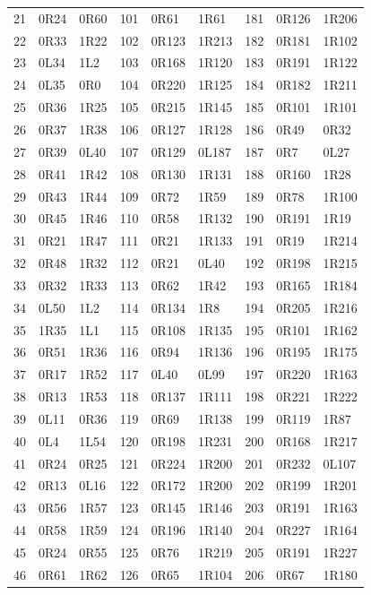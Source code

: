 \begin{longtable}{rll@{\hspace{1.3em}}rll@{\hspace{1.3em}}rll}
21 & 0R24 & 0R60 & 101 & 0R61 & 1R61 & 181 & 0R126 & 1R206\\
22 & 0R33 & 1R22 & 102 & 0R123 & 1R213 & 182 & 0R181 & 1R102\\
23 & 0L34 & 1L2 & 103 & 0R168 & 1R120 & 183 & 0R191 & 1R122\\
24 & 0L35 & 0R0 & 104 & 0R220 & 1R125 & 184 & 0R182 & 1R211\\
25 & 0R36 & 1R25 & 105 & 0R215 & 1R145 & 185 & 0R101 & 1R101\\
26 & 0R37 & 1R38 & 106 & 0R127 & 1R128 & 186 & 0R49 & 0R32\\
27 & 0R39 & 0L40 & 107 & 0R129 & 0L187 & 187 & 0R7 & 0L27\\
28 & 0R41 & 1R42 & 108 & 0R130 & 1R131 & 188 & 0R160 & 1R28\\
29 & 0R43 & 1R44 & 109 & 0R72 & 1R59 & 189 & 0R78 & 1R100\\
30 & 0R45 & 1R46 & 110 & 0R58 & 1R132 & 190 & 0R191 & 1R19\\
31 & 0R21 & 1R47 & 111 & 0R21 & 1R133 & 191 & 0R19 & 1R214\\
32 & 0R48 & 1R32 & 112 & 0R21 & 0L40 & 192 & 0R198 & 1R215\\
33 & 0R32 & 1R33 & 113 & 0R62 & 1R42 & 193 & 0R165 & 1R184\\
34 & 0L50 & 1L2 & 114 & 0R134 & 1R8 & 194 & 0R205 & 1R216\\
35 & 1R35 & 1L1 & 115 & 0R108 & 1R135 & 195 & 0R101 & 1R162\\
36 & 0R51 & 1R36 & 116 & 0R94 & 1R136 & 196 & 0R195 & 1R175\\
37 & 0R17 & 1R52 & 117 & 0L40 & 0L99 & 197 & 0R220 & 1R163\\
38 & 0R13 & 1R53 & 118 & 0R137 & 1R111 & 198 & 0R221 & 1R222\\
39 & 0L11 & 0R36 & 119 & 0R69 & 1R138 & 199 & 0R119 & 1R87\\
40 & 0L4 & 1L54 & 120 & 0R198 & 1R231 & 200 & 0R168 & 1R217\\
41 & 0R24 & 0R25 & 121 & 0R224 & 1R200 & 201 & 0R232 & 0L107\\
42 & 0R13 & 0L16 & 122 & 0R172 & 1R200 & 202 & 0R199 & 1R201\\
43 & 0R56 & 1R57 & 123 & 0R145 & 1R146 & 203 & 0R191 & 1R163\\
44 & 0R58 & 1R59 & 124 & 0R196 & 1R140 & 204 & 0R227 & 1R164\\
45 & 0R24 & 0R55 & 125 & 0R76 & 1R219 & 205 & 0R191 & 1R227\\
46 & 0R61 & 1R62 & 126 & 0R65 & 1R104 & 206 & 0R67 & 1R180\\

\end{longtable}
